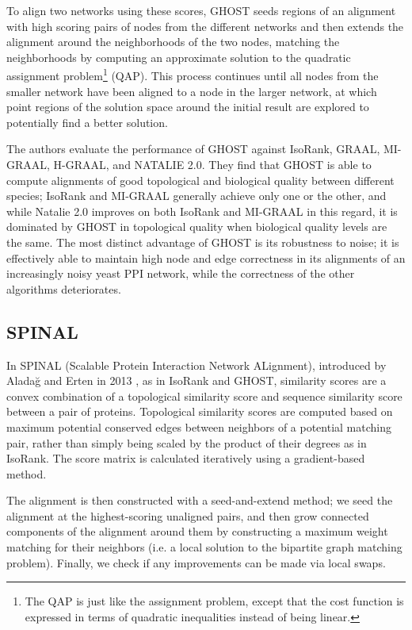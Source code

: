 \documentclass[12pt]{thesis}
\theoremstyle{plain}
\theoremstyle{definition}
\theoremstyle{remark}
\begin{document}
To align two networks using these scores, GHOST seeds regions of an alignment with high scoring pairs of nodes from the different networks and then extends the alignment around the neighborhoods of the two nodes, matching the neighborhoods by computing an approximate solution to the quadratic assignment problem\footnote{The QAP is just like the assignment problem, except that the cost function is expressed in terms of quadratic inequalities instead of being linear.} (QAP). This process continues until all nodes from the smaller network have been aligned to a node in the larger network, at which point regions of the solution space around the initial result are explored to potentially find a better solution.

The authors evaluate the performance of GHOST against IsoRank, GRAAL, MI-GRAAL, H-GRAAL, and NATALIE 2.0. They find that GHOST is able to compute alignments of good topological and biological quality between different species; IsoRank and MI-GRAAL generally achieve only one or the other, and while Natalie 2.0 improves on both IsoRank and MI-GRAAL in this regard, it is dominated by GHOST in topological quality when biological quality levels are the same. The most distinct advantage of GHOST is its robustness to noise; it is effectively able to maintain high node and edge correctness in its alignments of an increasingly noisy yeast PPI network, while the correctness of the other algorithms deteriorates. 

\subsection{SPINAL}

In SPINAL (Scalable Protein Interaction Network ALignment), introduced by Alada\u{g} and Erten in 2013 \cite{aladaug2013spinal}, as in IsoRank and GHOST, similarity scores are a convex combination of a topological similarity score and sequence similarity score between a pair of proteins. Topological similarity scores are computed based on maximum potential conserved edges between neighbors of a potential matching pair, rather than simply being scaled by the product of their degrees as in IsoRank. The score matrix is calculated iteratively using a gradient-based method.

The alignment is then constructed with a seed-and-extend method; we seed the alignment at the highest-scoring unaligned pairs, and then grow connected components of the alignment around them by constructing a maximum weight matching for their neighbors (i.e. a local solution to the bipartite graph matching problem). Finally, we check if any improvements can be made via local swaps.
\end{document}
